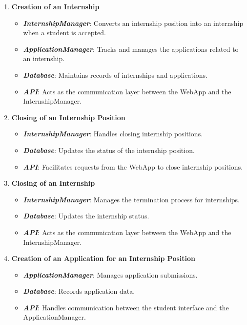 \begin{enumerate}
        \item \textbf{Creation of an Internship}
        \begin{itemize}
            \item \textit{\textbf{InternshipManager}}: Converts an internship position into an internship when a student is accepted.
            \item \textit{\textbf{ApplicationManager}}: Tracks and manages the applications related to an internship.
            \item \textit{\textbf{Database}}: Maintains records of internships and applications.
            \item \textit{\textbf{API}}: Acts as the communication layer between the WebApp and the InternshipManager.
        \end{itemize}

        \item \textbf{Closing of an Internship Position}
        \begin{itemize}
            \item \textit{\textbf{InternshipManager}}: Handles closing internship positions.
            \item \textit{\textbf{Database}}: Updates the status of the internship position.
            \item \textit{\textbf{API}}: Facilitates requests from the WebApp to close internship positions.
        \end{itemize}

        \item \textbf{Closing of an Internship}
        \begin{itemize}
            \item \textit{\textbf{InternshipManager}}: Manages the termination process for internships.
            \item \textit{\textbf{Database}}: Updates the internship status.
            \item \textit{\textbf{API}}: Acts as the communication layer between the WebApp and the InternshipManager.
        \end{itemize}

        \item \textbf{Creation of an Application for an Internship Position}
        \begin{itemize}
            \item \textit{\textbf{ApplicationManager}}: Manages application submissions.
            \item \textit{\textbf{Database}}: Records application data.
            \item \textit{\textbf{API}}: Handles communication between the student interface and the ApplicationManager.
        \end{itemize}


\end{enumerate}
